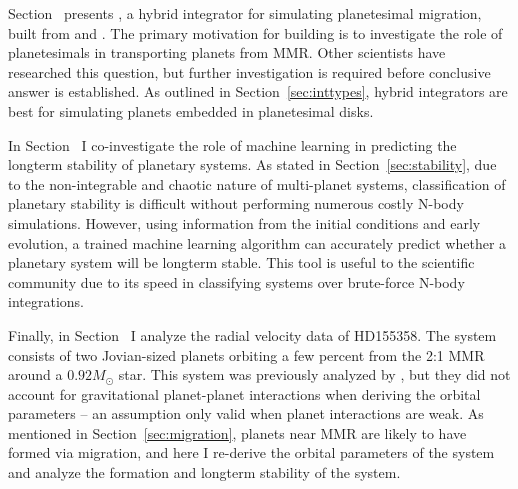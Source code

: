 Section~\label{Fill} presents \hermes, a hybrid integrator for simulating planetesimal migration, built from \ias \citep{Rein2015a} and \whfast \citep{Rein2015b}. 
The primary motivation for building \hermes is to investigate the role of planetesimals in transporting planets from MMR. 
Other scientists \citep{Chatterjee2015} have researched this question, but further investigation is required before conclusive answer is established.
As outlined in Section~\ref{sec:inttypes}, hybrid integrators are best for simulating planets embedded in planetesimal disks. 

In Section~\label{Fill} I co-investigate the role of machine learning in predicting the longterm stability of planetary systems. 
As stated in Section~\ref{sec:stability}, due to the non-integrable and chaotic nature of multi-planet systems, classification of planetary stability is difficult without performing numerous costly N-body simulations. 
However, using information from the initial conditions and early evolution, a trained machine learning algorithm can accurately predict whether a planetary system will be longterm stable.  
This tool is useful to the scientific community due to its speed in classifying systems over brute-force N-body integrations.  

Finally, in Section~\label{Fill} I analyze the radial velocity data of HD155358. 
The system consists of two Jovian-sized planets orbiting a few percent from the 2:1 MMR around a $0.92M_{\odot}$ star. 
This system was previously analyzed by \citet{Robertson2012}, but they did not account for gravitational planet-planet interactions when deriving the orbital parameters -- an assumption only valid when planet interactions are weak. 
As mentioned in Section~\ref{sec:migration}, planets near MMR are likely to have formed via migration, and here I re-derive the orbital parameters of the system and analyze the formation and longterm stability of the system. 
